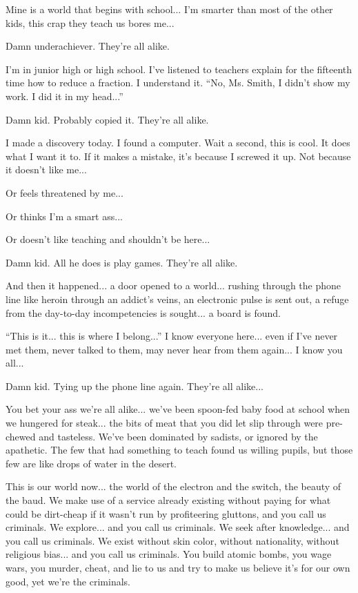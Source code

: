 \documentclass[letterpaper,12pt,english]{sphinxmanual}
\begin{document}
Mine is a world that begins with school... I'm smarter than most of the other kids, this crap they teach us bores me...

Damn underachiever. They're all alike.

I'm in junior high or high school. I've listened to teachers explain for the fifteenth time how to reduce a fraction. I understand it. ``No, Ms. Smith, I didn't show my work. I did it in my head...''

Damn kid. Probably copied it. They're all alike.

I made a discovery today. I found a computer. Wait a second, this is cool. It does what I want it to. If it makes a mistake, it's because I screwed it up. Not because it doesn't like me...

Or feels threatened by me...

Or thinks I'm a smart ass...

Or doesn't like teaching and shouldn't be here...

Damn kid. All he does is play games. They're all alike.

And then it happened... a door opened to a world... rushing through the phone line like heroin through an addict's veins, an electronic pulse is sent out, a refuge from the day-to-day incompetencies is sought... a board is found.

``This is it... this is where I belong...''
I know everyone here... even if I've never met them, never talked to them, may never hear from them again... I know you all...

Damn kid. Tying up the phone line again. They're all alike...

You bet your ass we're all alike... we've been spoon-fed baby food at school when we hungered for steak... the bits of meat that you did let slip through were pre-chewed and tasteless. We've been dominated by sadists, or ignored by the apathetic. The few that had something to teach found us willing pupils, but those few are like drops of water in the desert.

This is our world now... the world of the electron and the switch, the beauty of the baud. We make use of a service already existing without paying for what could be dirt-cheap if it wasn't run by profiteering gluttons, and you call us criminals. We explore... and you call us criminals. We seek after knowledge... and you call us criminals. We exist without skin color, without nationality, without religious bias... and you call us criminals. You build atomic bombs, you wage wars, you murder, cheat, and lie to us and try to make us believe it's for our own good, yet we're the criminals.
\end{document}
